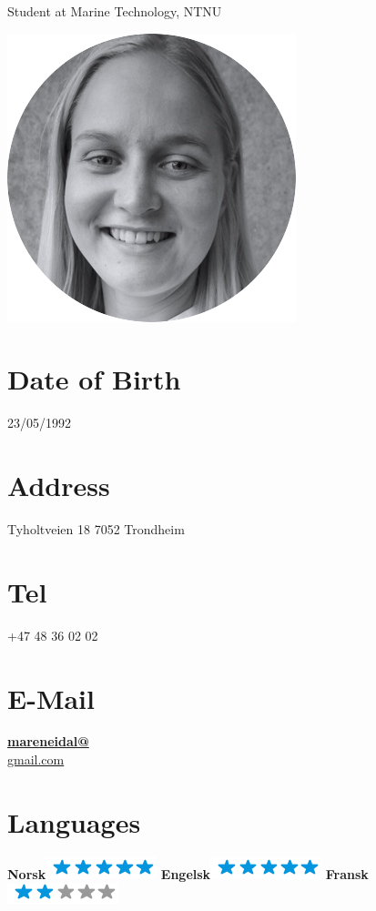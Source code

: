 \documentclass[]{friggeri-cv}
\begin{document}
      {Student at Marine Technology, NTNU}
      

\begin{aside}
  \includegraphics[scale= 0.45, left]{img/circular_cv_photo.png}
  \section{Date of Birth}
    23/05/1992
    ~
  \section{Address}
    Tyholtveien 18
    7052 Trondheim
    ~
  \section{Tel}
    +47 48 36 02 02
    ~
  \section{E-Mail}
    \href{mailto:mareneidal@gmail.com}{\textbf{mareneidal@}\\gmail.com}
  \section{Languages}
    \textbf{Norsk}\includegraphics[scale=0.40]{img/5stars.png}
    \textbf{Engelsk}\includegraphics[scale=0.40]{img/5stars.png}
    \textbf{Fransk}\includegraphics[scale=0.40]{img/2stars.png}
    ~

\end{aside}
\end{document}
